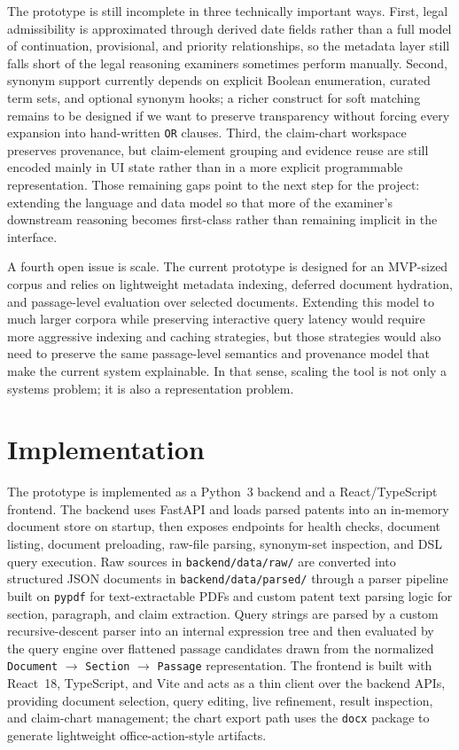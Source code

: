\documentclass[sigconf]{acmart}
\newcommand{\DocSectionPassage}{\texttt{Document} $\to$ \texttt{Section} $\to$ \texttt{Passage}}
\begin{document}
The prototype is still incomplete in three technically important ways. First,
legal admissibility is approximated through derived date fields rather than a
full model of continuation, provisional, and priority relationships, so the
metadata layer still falls short of the legal reasoning examiners sometimes
perform manually. Second, synonym support currently depends on explicit Boolean
enumeration, curated term sets, and optional synonym hooks; a richer construct
for soft matching remains to be designed if we want to preserve transparency
without forcing every expansion into hand-written \texttt{OR} clauses. Third,
the claim-chart workspace preserves provenance, but claim-element grouping and
evidence reuse are still encoded mainly in UI state rather than in a more
explicit programmable representation. Those remaining gaps point to the next
step for the project: extending the language and data model so that more of the
examiner's downstream reasoning becomes first-class rather than remaining
implicit in the interface.

A fourth open issue is scale. The current prototype is designed for an MVP-sized
corpus and relies on lightweight metadata indexing, deferred document
hydration, and passage-level evaluation over selected documents. Extending this
model to much larger corpora while preserving interactive query latency would
require more aggressive indexing and caching strategies, but those strategies
would also need to preserve the same passage-level semantics and provenance
model that make the current system explainable. In that sense, scaling the tool
is not only a systems problem; it is also a representation problem.


\section{Implementation}

The prototype is implemented as a Python~3 backend and a React/TypeScript
frontend. The backend uses FastAPI and loads parsed patents into an in-memory
document store on startup, then exposes endpoints for health checks, document
listing, document preloading, raw-file parsing, synonym-set inspection, and DSL
query execution. Raw sources in \texttt{backend/data/raw/} are converted into
structured JSON documents in \texttt{backend/data/parsed/} through a parser
pipeline built on \texttt{pypdf} for text-extractable PDFs and custom patent
text parsing logic for section, paragraph, and claim extraction. Query strings
are parsed by a custom recursive-descent parser into an internal expression
tree and then evaluated by the query engine over flattened passage candidates
drawn from the normalized \DocSectionPassage{}
representation. The frontend is built with React~18, TypeScript, and Vite and
acts as a thin client over the backend APIs, providing document selection,
query editing, live refinement, result inspection, and claim-chart management;
the chart export path uses the \texttt{docx} package to generate lightweight
office-action-style artifacts.
\end{document}
